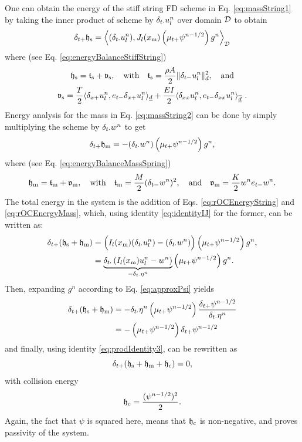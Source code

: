 One can obtain the energy of the stiff string FD scheme in Eq. \eqref{eq:massString1} by taking the inner product of scheme by $\delta_{t\cdot} u_l^n$ over domain $\mathcal{D}$ to obtain 
\begin{equation}\label{eq:rOCEnergyString}
    \delta_{t+} \mathfrak{h}_\text{s} = \left\langle (\delta_{t\cdot} u_l^n), J_l(x_\text{m})\left(\mu_{t+} \psi^{n-1/2}\right)g^n\right\rangle_{\mathcal{D}}
\end{equation}
where (see Eq. \eqref{eq:energyBalanceStiffString})
\begin{equation*}
    \begin{gathered}
        \mathfrak{h}_\text{s} = \mathfrak{t}_\text{s} + \mathfrak{v}_\text{s}, \quad \text{with} \quad \mathfrak{t}_\text{s} = \frac{\rho A}{2}\lVert\delta_{t-} u_l^n\rVert^2_d,\quad \text{and} \\
        \mathfrak{v}_\text{s} = \frac{T}{2}\langle\delta_{x+}u_l^n, e_{t-}\delta_{x+}u_l^n\rangle_{\underline{d}} + \frac{EI}{2}\langle\delta_{xx}u_l^n, e_{t-}\delta_{xx}u_l^n\rangle_{\overline{\underline{d}}}\ .
    \end{gathered}
\end{equation*}
Energy analysis for the mass in Eq. \eqref{eq:massString2} can be done by simply multiplying the scheme by $\delta_{t\cdot} w^n$ to get 
\begin{equation}\label{eq:rOCEnergyMass}
    \delta_{t+} \mathfrak{h}_\text{m} = -(\delta_{t\cdot} w^n)\left(\mu_{t+} \psi^{n-1/2}\right)g^n,
\end{equation}
where (see Eq. \eqref{eq:energyBalanceMassSpring})
\begin{equation*}
    \mathfrak{h}_\text{m} = \mathfrak{t}_\text{m} + \mathfrak{v}_\text{m}, \quad \text{with} \quad \mathfrak{t}_\text{m} = \frac{M}{2}(\delta_{t-} w^n)^2, \quad \text{and} \quad \mathfrak{v}_\text{m} = \frac{K}{2}w^n e_{t-}w^n.
\end{equation*}
The total energy in the system is the addition of Eqs. \eqref{eq:rOCEnergyString} and \eqref{eq:rOCEnergyMass}, which, using identity \eqref{eq:identityIJ} for the former, can be written as:
\begin{align*}
    \delta_{t+}(\mathfrak{h}_\text{s} + \mathfrak{h}_\text{m}) &= \Big(I_l(x_\text{m})(\delta_{t\cdot} u_l^n) - (\delta_{t\cdot} w^n)\Big)\left(\mu_{t+} \psi^{n-1/2}\right)g^n,\\
    &= \underbrace{\delta_{t\cdot}\left(I_l(x_\text{m})u_l^n - w^n\right)}_{-\delta_{t\cdot} \eta^n}\left(\mu_{t+} \psi^{n-1/2}\right)g^n.
\end{align*}
Then, expanding $g^n$ according to Eq. \eqref{eq:approxPsi} yields 
\begin{align*}
    \delta_{t+}(\mathfrak{h}_\text{s} + \mathfrak{h}_\text{m}) &= - \delta_{t\cdot}\eta^n\left(\mu_{t+} \psi^{n-1/2}\right)\frac{\delta_{t+}\psi^{n-1/2}}{\delta_{t\cdot}\eta^n}\\
    &= -\left(\mu_{t+} \psi^{n-1/2}\right)\delta_{t+}\psi^{n-1/2}
\end{align*}
and finally, using identity \eqref{eq:prodIdentity3}, can be rewritten as
\begin{equation}
    \delta_{t+}(\mathfrak{h}_\text{s} + \mathfrak{h}_\text{m} + \mathfrak{h}_\text{c}) = 0,
\end{equation}
with collision energy
\begin{equation*}
    \mathfrak{h}_\text{c} = \frac{(\psi^{n-1/2})^2}{2}.
\end{equation*}
Again, the fact that $\psi$ is squared here, means that $\mathfrak{h}_\text{c}$ is non-negative, and proves passivity of the system. 

